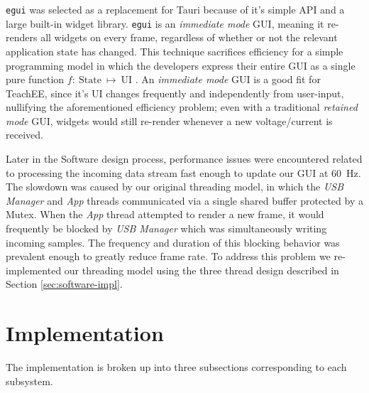 \documentclass[letterpaper,11pt]{article}
\newcommand{\code}[1]{\texttt{#1}}
\begin{document}
\code{egui} was selected as a replacement for Tauri because of it's simple API
and a large built-in widget library. \code{egui} is an \emph{immediate mode}
GUI, meaning it re-renders all widgets on every frame, regardless of whether or
not the relevant application state has changed. This technique sacrifices
efficiency for a simple programming model in which the developers express their
entire GUI as a single pure function \(f:~\text{State}~\mapsto~\text{UI}\)
\cite{egui}. An \emph{immediate mode} GUI is a good fit for TeachEE, since it's
UI changes frequently and independently from user-input, nullifying the
aforementioned efficiency problem; even with a traditional \emph{retained mode}
GUI, widgets would still re-render whenever a new voltage/current is received.

Later in the Software design process, performance issues were encountered
related to processing the incoming data stream fast enough to update our GUI at
\SI{60}{\hertz}. The slowdown was caused by our original threading model, in
which the \emph{USB Manager} and \emph{App} threads communicated via a single
shared buffer protected by a Mutex. When the \emph{App} thread attempted to
render a new frame, it would frequently be blocked by \emph{USB Manager} which
was simultaneously writing incoming samples. The frequency and duration of this
blocking behavior was prevalent enough to greatly reduce frame rate. To address
this problem we re-implemented our threading model using the three thread
design described in Section \ref{sec:software-impl}.

\section{Implementation} \label{sec:impl}


The implementation is broken up into three subsections corresponding to each
subsystem.
\end{document}
